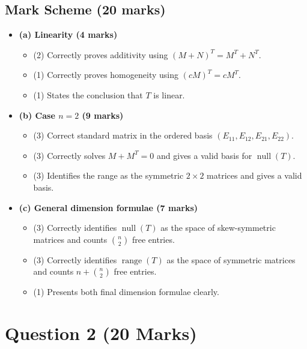\documentclass[12pt]{article}
\newcommand{\Null}{\operatorname{null}}
\newcommand{\Range}{\operatorname{range}}
\begin{document}
\subsection{Mark Scheme (20 marks)}
\begin{itemize}[leftmargin=1.6em]
  \item \textbf{(a) Linearity (4 marks)}
  \begin{itemize}[leftmargin=1.6em]
    \item (2) Correctly proves additivity using $(M+N)^T=M^T+N^T$.
    \item (1) Correctly proves homogeneity using $(cM)^T=cM^T$.
    \item (1) States the conclusion that $T$ is linear.
  \end{itemize}
  \item \textbf{(b) Case $n=2$ (9 marks)}
  \begin{itemize}[leftmargin=1.6em]
    \item (3) Correct standard matrix in the ordered basis $(E_{11},E_{12},E_{21},E_{22})$.
    \item (3) Correctly solves $M+M^T=0$ and gives a valid basis for $\Null(T)$.
    \item (3) Identifies the range as the symmetric $2\times2$ matrices and gives a valid basis.
  \end{itemize}
  \item \textbf{(c) General dimension formulae (7 marks)}
  \begin{itemize}[leftmargin=1.6em]
    \item (3) Correctly identifies $\Null(T)$ as the space of skew-symmetric matrices and counts $\binom n2$ free entries.
    \item (3) Correctly identifies $\Range(T)$ as the space of symmetric matrices and counts $n+\binom n2$ free entries.
    \item (1) Presents both final dimension formulae clearly.
  \end{itemize}
\end{itemize}

\newpage
\section{Question 2 \hfill (20 Marks)}
\end{document}

